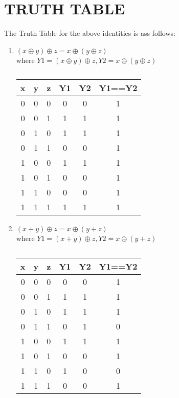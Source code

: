 \documentclass[a4paper,11pt,twocolumn]{article}
\begin{document}
\section{TRUTH TABLE}
The Truth Table for the above identities is ass follows:
\begin{enumerate}[label=\textbf{(\Alph*})]
	\item \textbf{$  (x\oplus y)\oplus z = x\oplus(y\oplus z)$} \\
where $Y1=(x\oplus y)\oplus z,Y2=x\oplus(y\oplus z)$\\
\bigskip
\begin{table}[ht!]
	\centering
\begin{tabular}{ |c |c |c |c |c |c |} 
\hline 
\newline 
	\textbf{x} & \textbf{y} & \textbf{z} & \textbf{Y1} & \textbf{Y2} & \textbf{Y1==Y2} \\ 
\hline  
	0 & 0 & 0 &0 &0 &1\\   
	0 & 0 & 1 &1 &1 &1\\  
	0 & 1 & 0 &1 &1 &1\\  
	0 & 1 & 1 &0 &0 &1\\  
	1 & 0 & 0 &1 &1 &1\\  
	1 & 0 & 1 &0 &0 &1\\  
	1 & 1 & 0 &0 &0 &1\\  
	1 & 1 & 1 &1 &1 &1\\  
\hline 
\end{tabular}
	\caption{}
\end{table}
\bigskip
\bigskip
	
	\item \textbf{$(x+y)\oplus z=x\oplus(y+z)$}\\
where $Y1=(x+y)\oplus z, Y2=x\oplus(y+z)$\\
\bigskip
\begin{table}[ht!]
	\centering
\begin{tabular}{ |c |c |c |c |c |c |} 
\hline 
\newline 
	\textbf{x} & \textbf{y} & \textbf{z} & \textbf{Y1} & \textbf{Y2} & \textbf{Y1==Y2}\\
\hline  
	0 & 0 & 0 &0 &0 &1\\   
	0 & 0 & 1 &1 &1 &1\\ 
	0 & 1 & 0 &1 &1 &1\\  
	0 & 1 & 1 &0 &1 &0\\  
	1 & 0 & 0 &1 &1 &1\\  
	1 & 0 & 1 &0 &0 &1\\  
	1 & 1 & 0 &1 &0 &0\\  
	1 & 1 & 1 &0 &0 &1\\  
\hline 
\end{tabular}
\caption{}
\end{table}
\bigskip


\end{enumerate}
\end{document}
